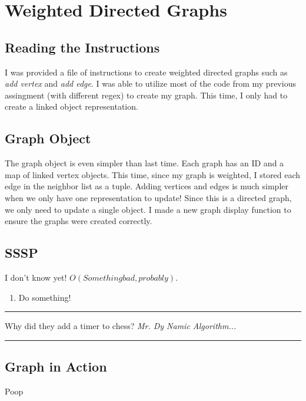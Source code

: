 \documentclass[letterpaper, 10pt]{article}
\begin{document}
\section{Weighted Directed Graphs}
\subsection{Reading the Instructions}
I was provided a file of instructions to create weighted directed graphs such as \textit{add vertex} and \textit{add edge}. I was able to utilize most of the code from my previous assingment (with different regex) to create my graph. This time, I only had to create a linked object representation.  


\subsection{Graph Object}
The graph object is even simpler than last time. Each graph has an ID and a map of linked vertex objects. This time, since my graph is weighted, I stored each edge in the neighbor list as a tuple. Adding vertices and edges is much simpler when we only have one representation to update! Since this is a directed graph, we only need to update a single object. I made a new graph display function to ensure the graphs were created correctly. 


\subsection{SSSP}
I don't know yet! $O(Something bad, probably)$.
\begin{enumerate}
    \item Do something!
\end{enumerate}

\hrule
\vspace{.25cm}
Why did they add a timer to chess? \textit{Mr. Dy Namic Algorithm...}\\
\hrule
\vspace{.5cm}

\subsection{Graph in Action}
Poop

\end{document}
